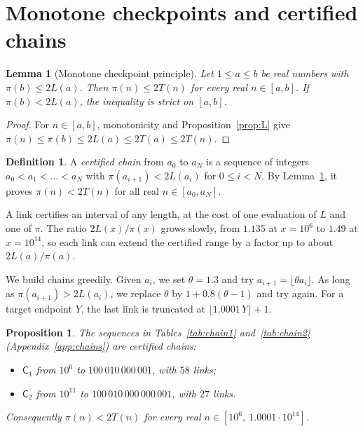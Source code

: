 \documentclass[11pt,a4paper]{article}
\newtheorem{proposition}[theorem]{Proposition}
\newtheorem{lemma}[theorem]{Lemma}
\theoremstyle{definition}
\newtheorem{definition}[theorem]{Definition}
\begin{document}
\section{Monotone checkpoints and certified chains}\label{sec:chains}

\begin{lemma}[Monotone checkpoint principle]\label{lem:checkpoint}
Let $1\le a\le b$ be real numbers with $\pi(b)\le2L(a)$. Then $\pi(n)\le2T(n)$ for every real $n\in[a,b]$. If $\pi(b)<2L(a)$, the inequality is strict on $[a,b]$.
\end{lemma}

\begin{proof}
For $n\in[a,b]$, monotonicity and Proposition~\ref{prop:L} give $\pi(n)\le\pi(b)\le2L(a)\le2T(a)\le2T(n)$.
\end{proof}

\begin{definition}
A \emph{certified chain} from $a_0$ to $a_N$ is a sequence of integers $a_0<a_1<\dots<a_N$ with $\pi(a_{i+1})<2L(a_i)$ for $0\le i<N$. By Lemma~\ref{lem:checkpoint}, it proves $\pi(n)<2T(n)$ for all real $n\in[a_0,a_N]$.
\end{definition}

A link certifies an interval of any length, at the cost of one evaluation of $L$ and one of $\pi$. The ratio $2L(x)/\pi(x)$ grows slowly, from $1.135$ at $x=10^6$ to $1.49$ at $x=10^{14}$, so each link can extend the certified range by a factor up to about $2L(a)/\pi(a)$.

We build chains greedily. Given $a_i$, we set $\theta=1.3$ and try $a_{i+1}=\lfloor\theta a_i\rfloor$. As long as $\pi(a_{i+1})>2L(a_i)$, we replace $\theta$ by $1+0.8(\theta-1)$ and try again. For a target endpoint $Y$, the last link is truncated at $\lfloor1.0001\,Y\rfloor+1$.

\begin{proposition}\label{prop:chains}
The sequences in Tables~\ref{tab:chain1} and~\ref{tab:chain2} (Appendix~\ref{app:chains}) are certified chains:
\begin{itemize}
\item $\mathsf C_1$ from $10^{6}$ to $100\,010\,000\,001$, with $58$ links;
\item $\mathsf C_2$ from $10^{11}$ to $100\,010\,000\,000\,001$, with $27$ links.
\end{itemize}
Consequently $\pi(n)<2T(n)$ for every real $n\in[10^{6},\ 1.0001\cdot10^{14}]$.
\end{proposition}
\end{document}
